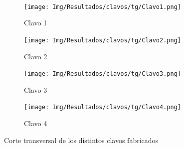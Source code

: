 \documentclass[a4paper,12pt,fleqn,twoside,openany]{book}
\begin{document}
  \begin{figure}%
    \centering
    
    ~ %
    \begin{subfigure}{0.3\textwidth}
        \texttt{[image: Img/Resultados/clavos/tg/Clavo1.png]}
        \caption{Clavo 1}%
        \label{fig: MClavo1}
    \end{subfigure}
        \begin{subfigure}{0.3\textwidth}
        \texttt{[image: Img/Resultados/clavos/tg/Clavo2.png]}
        \caption{Clavo 2}%
        \label{fig: MClavo2}
    \end{subfigure}
    \newline
    \centering
        \begin{subfigure}{0.3\textwidth}
        \texttt{[image: Img/Resultados/clavos/tg/Clavo3.png]}
        \caption{Clavo 3}%
        \label{fig: MClavo3}
    \end{subfigure}
        \begin{subfigure}{0.3\textwidth}
        \texttt{[image: Img/Resultados/clavos/tg/Clavo4.png]}
        \caption{Clavo 4}%
        \label{fig: MClavo4}
    \end{subfigure}    
    \caption{Corte transversal de los distintos clavos fabricados }
    \end{figure}
\end{document}
